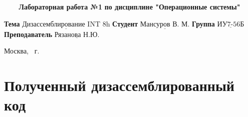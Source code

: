 \documentclass[a4paper,14pt]{article}
\begin{document}
\begin{titlepage}
	\begin{center}
		\noindent\begin{minipage}{1.0\textwidth}\centering
			\Large\textbf{   ~~~ Лабораторная работа №1}\newline
			\textbf{по дисциплине "Операционные системы"}\newline
		\end{minipage}
	\end{center}
	\noindent\textbf{Тема} $\underline{\text{Дизассемблирование INT 8h}}$\newline\newline
	\noindent\textbf{Студент} $\underline{\text{Мансуров В. М.}}$\newline\newline
	\noindent\textbf{Группа} $\underline{\text{ИУ7-56Б}}$\newline\newline
	\noindent\textbf{Преподаватель} $\underline{\text{Рязанова Н.Ю.}}$\newline
	
	\begin{center}
		\mbox{}
		\vfill
		Москва, \the\year ~г.
	\end{center}
	\clearpage
\end{titlepage}

\section{Полученный дизассемблированный код}
\end{document}
